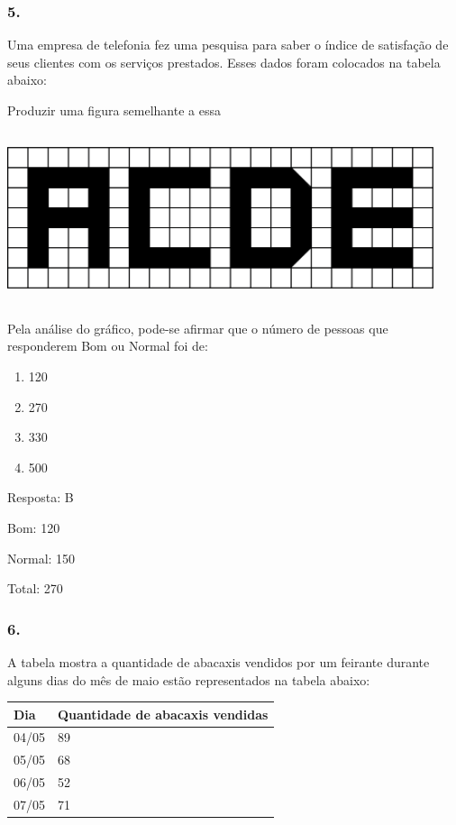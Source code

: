 \subsubsection{5.}\label{section-112}

Uma empresa de telefonia fez uma pesquisa para saber o índice de
satisfação de seus clientes com os serviços prestados. Esses dados foram
colocados na tabela abaixo:

Produzir uma figura semelhante a essa

\includegraphics[width=4.92543in,height=1.97517in]{media/image96.png}

Pela análise do gráfico, pode-se afirmar que o número de pessoas que
responderem Bom ou Normal foi de:

\begin{enumerate}
\def\labelenumi{\alph{enumi})}
\item
  120
\item
  270
\item
  330
\item
  500
\end{enumerate}

Resposta: B

Bom: 120

Normal: 150

Total: 270

\subsubsection{6.}\label{section-113}

A tabela mostra a quantidade de abacaxis vendidos por um feirante
durante alguns dias do mês de maio estão representados na tabela abaixo:

\begin{longtable}[]{@{}ll@{}}
\toprule
Dia & Quantidade de abacaxis vendidas\tabularnewline
\midrule
\endhead
04/05 & 89\tabularnewline
05/05 & 68\tabularnewline
06/05 & 52\tabularnewline
07/05 & 71\tabularnewline
\bottomrule
\end{longtable}

